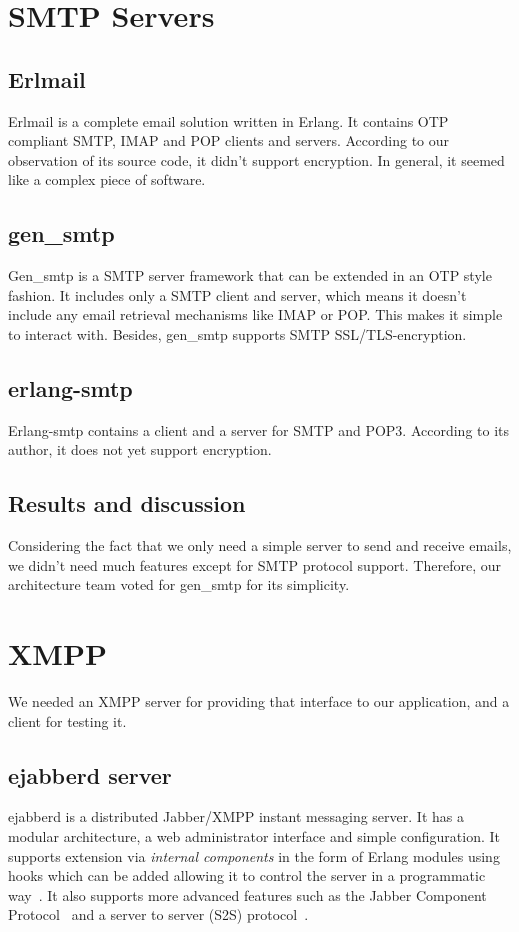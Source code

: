 \documentclass[11pt,a4paper]{report}
\begin{document}
\section{SMTP Servers}
\subsection{Erlmail}
Erlmail is a complete email solution written in Erlang. It contains OTP
compliant SMTP, IMAP and POP clients and servers. According to our observation
of its source code, it didn't support encryption. In general, it seemed like a
complex piece of software.

\subsection{gen\_smtp}
Gen\_smtp is a SMTP server framework that can be extended in an OTP style
fashion. It includes only a SMTP client and server, which means it doesn't
include any email retrieval mechanisms like IMAP or POP. This makes it simple to
interact with. Besides, gen\_smtp supports SMTP SSL/TLS-encryption.

\subsection{erlang-smtp}
Erlang-smtp contains a client and a server for SMTP and POP3.
According to its author, it does not yet support encryption.

\subsection{Results and discussion}
Considering the fact that we only need a simple server to send and receive
emails, we didn't need much features except for SMTP protocol
support. Therefore, our architecture team voted for gen\_smtp for its
simplicity.

\section{XMPP}
We needed an XMPP server for providing that interface to our application, and a
client for testing it.

\subsection{ejabberd server}
ejabberd is a distributed Jabber/XMPP instant messaging server. It has a modular
architecture, a web administrator interface and simple configuration. It
supports extension via \emph{internal components} in the form of Erlang modules
using hooks which can be added allowing it to control the server in a
programmatic way~\cite{ejabberd-plugin}. It also supports more advanced features
such as the Jabber Component Protocol~\cite{xmpp-component} and a server to
server (S2S) protocol~\cite{xmpp-s2s}.
\end{document}
